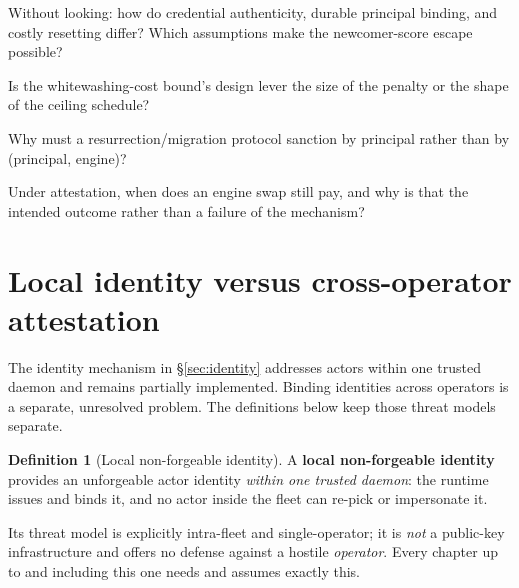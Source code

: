 \documentclass[11pt,a4paper]{article}
\theoremstyle{definition}
\newtheorem{definition}{Definition}[section]
\newcounter{protocol}[section]
\begin{document}
\pdexercisepointer*{\ref{ex:stp-property-reality}}{\ref{ex:stp-resurrection-soundness}}{\pageref{ex:stp-property-reality}}

\begin{pdrecitation}
\item Without looking: how do credential authenticity, durable principal
binding, and costly resetting differ? Which assumptions make the newcomer-score
escape possible?
\item Is the whitewashing-cost bound's design lever the size of the penalty
or the shape of the ceiling schedule?
\item Why must a resurrection/migration protocol sanction by principal rather
than by (principal, engine)?
\item Under attestation, when does an engine swap still pay, and why is that
the intended outcome rather than a failure of the mechanism?
\end{pdrecitation}

\section{Local identity versus cross-operator attestation}\label{sec:keystone}

The identity mechanism in \S\ref{sec:identity} addresses actors within one
trusted daemon and remains partially implemented. Binding identities across
operators is a separate, unresolved problem. The definitions below keep those
threat models separate.

\begin{definition}[Local non-forgeable identity]\label{def:0040}
\setlength{\parskip}{4pt plus 1pt}
A \textbf{local non-forgeable identity} provides an unforgeable actor identity
\emph{within one trusted daemon}: the runtime issues and binds it, and no actor
inside the fleet can re-pick or impersonate it.

Its threat model is explicitly
intra-fleet and single-operator; it is \emph{not} a public-key infrastructure and
offers no defense against a hostile \emph{operator}. Every chapter up to and
including this one needs and assumes exactly this.
\end{definition}
\end{document}
